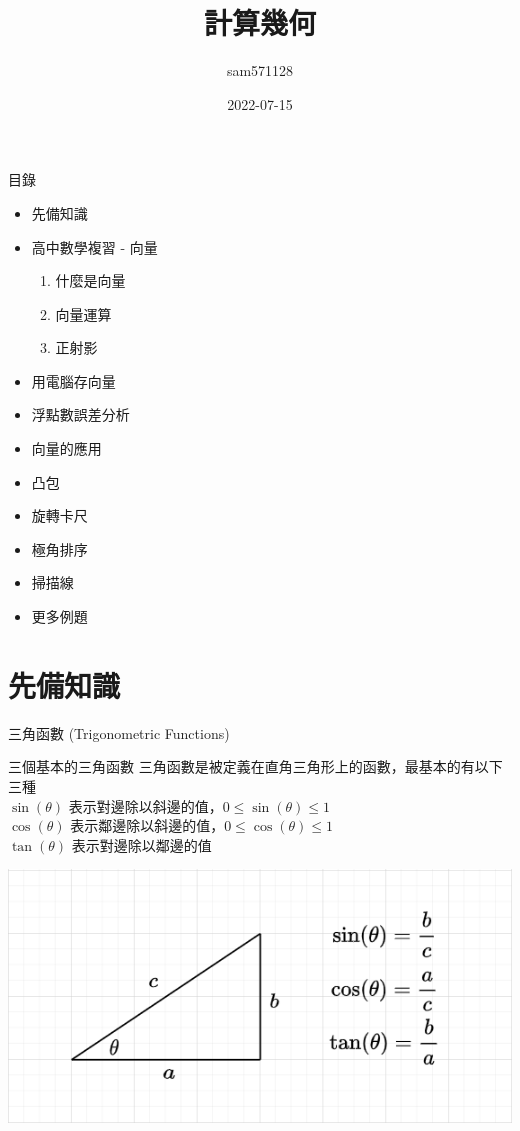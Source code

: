 \documentclass[aspectratio=169]{beamer}
\title{計算幾何}
\author{sam571128}
\date{2022-07-15}
\begin{document}
\frame{\titlepage}

\begin{frame}{目錄}
    \begin{itemize}
        \item 先備知識
        \item 高中數學複習 - 向量
        \begin{enumerate}
            \item 什麼是向量
            \item 向量運算
            \item 正射影
        \end{enumerate}
        \item 用電腦存向量
        \item 浮點數誤差分析
        \item 向量的應用
        \item 凸包
        \item 旋轉卡尺
        \item 極角排序
        \item 掃描線
        \item 更多例題
    \end{itemize}
\end{frame}

\section{先備知識}

\begin{frame}{三角函數 (Trigonometric Functions)}
    \begin{alertblock}{三個基本的三角函數}
    三角函數是被定義在直角三角形上的函數，最基本的有以下三種 \\
    \vspace{5mm}
    $\sin(\theta)$ 表示對邊除以斜邊的值，$0 \le \sin(\theta) \le 1$ \\
    $\cos(\theta)$ 表示鄰邊除以斜邊的值，$0 \le \cos(\theta) \le 1$ \\
    $\tan(\theta)$ 表示對邊除以鄰邊的值 
    \end{alertblock}
    \begin{center}
        \includegraphics[scale=0.4]{images/Trigonometry Functions.png}
    \end{center}
\end{frame}
\end{document}
